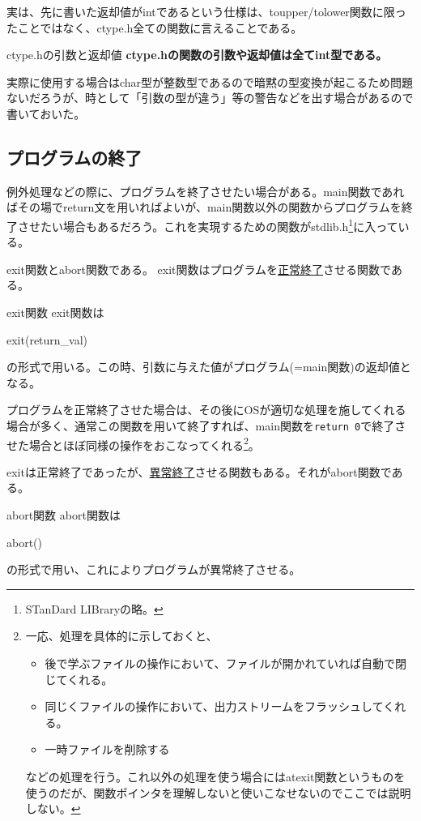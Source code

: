 実は、先に書いた返却値がintであるという仕様は、toupper/tolower関数に限ったことではなく、ctype.h全ての関数に言えることである。
\begin{itembox}[l]{ctype.hの引数と返却値}
\textbf{ctype.hの関数の引数や返却値は全てint型である。}
\end{itembox}

実際に使用する場合はchar型が整数型であるので暗黙の型変換が起こるため問題ないだろうが、時として「引数の型が違う」等の警告などを出す場合があるので書いておいた。

\subsection{プログラムの終了}
例外処理などの際に、プログラムを終了させたい場合がある。main関数であればその場でreturn文を用いればよいが、main関数以外の関数からプログラムを終了させたい場合もあるだろう。これを実現するための関数がstdlib.h\footnote{STanDard LIBraryの略。}に入っている。

exit関数とabort関数である。
exit関数はプログラムを\underline{正常終了}させる関数である。
\begin{itembox}[l]{exit関数}
exit関数は
\begin{code}
exit(return_val)
\end{code}
の形式で用いる。この時、引数に与えた値がプログラム(=main関数)の返却値となる。
\end{itembox}

プログラムを正常終了させた場合は、その後にOSが適切な処理を施してくれる場合が多く、通常この関数を用いて終了すれば、main関数を\verb|return 0|で終了させた場合とほぼ同様の操作をおこなってくれる\footnote{一応、処理を具体的に示しておくと、
\begin{itemize}
\item 後で学ぶファイルの操作において、ファイルが開かれていれば自動で閉じてくれる。
\item 同じくファイルの操作において、出力ストリームをフラッシュしてくれる。
\item 一時ファイルを削除する
\end{itemize}
などの処理を行う。これ以外の処理を使う場合にはatexit関数というものを使うのだが、関数ポインタを理解しないと使いこなせないのでここでは説明しない。
}。

exitは正常終了であったが、\underline{異常終了}させる関数もある。それがabort関数である。
\begin{itembox}[l]{abort関数}
abort関数は
\begin{code}
abort()
\end{code}
の形式で用い、これによりプログラムが異常終了させる。
\end{itembox}

